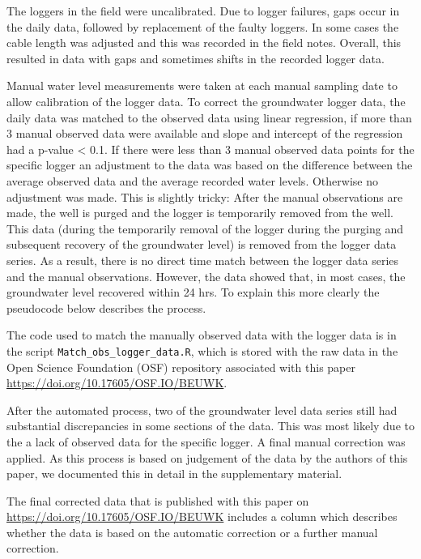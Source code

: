 \documentclass[, manuscript]{copernicus}
\begin{document}
The loggers in the field were uncalibrated. Due to logger failures, gaps
occur in the daily data, followed by replacement of the faulty loggers.
In some cases the cable length was adjusted and this was recorded in the
field notes. Overall, this resulted in data with gaps and sometimes
shifts in the recorded logger data.

Manual water level measurements were taken at each manual sampling date
to allow calibration of the logger data. To correct the groundwater
logger data, the daily data was matched to the observed data using
linear regression, if more than 3 manual observed data were available
and slope and intercept of the regression had a p-value \textless{} 0.1.
If there were less than 3 manual observed data points for the specific
logger an adjustment to the data was based on the difference between the
average observed data and the average recorded water levels. Otherwise
no adjustment was made. This is slightly tricky: After the manual
observations are made, the well is purged and the logger is temporarily
removed from the well. This data (during the temporarily removal of the
logger during the purging and subsequent recovery of the groundwater
level) is removed from the logger data series. As a result, there is no
direct time match between the logger data series and the manual
observations. However, the data showed that, in most cases, the
groundwater level recovered within 24 hrs. To explain this more clearly
the pseudocode below describes the process.

The code used to match the manually observed data with the logger data
is in the script \texttt{Match\_obs\_logger\_data.R}, which is stored
with the raw data in the Open Science Foundation (OSF) repository
associated with this paper \url{https://doi.org/10.17605/OSF.IO/BEUWK}.

After the automated process, two of the groundwater level data series
still had substantial discrepancies in some sections of the data. This
was most likely due to the a lack of observed data for the specific
logger. A final manual correction was applied. As this process is based
on judgement of the data by the authors of this paper, we documented
this in detail in the supplementary material.

The final corrected data that is published with this paper on
\url{https://doi.org/10.17605/OSF.IO/BEUWK} includes a column which
describes whether the data is based on the automatic correction or a
further manual correction.
\end{document}
